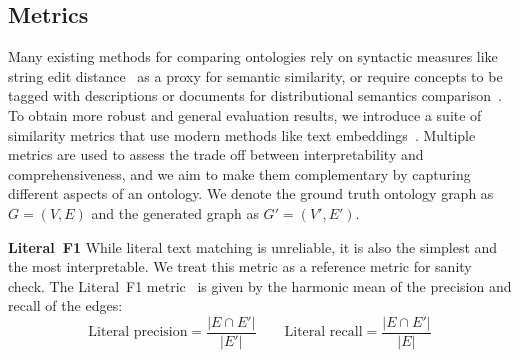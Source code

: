 \documentclass{article}
\newcommand{\fig}[1]{\textcolor{teal}{Figure: #1}}
\begin{document}

\subsection{Metrics}

Many existing methods for comparing ontologies rely on syntactic measures like string edit distance~\cite{Ehrig2005SimilarityFO} as a proxy for semantic similarity, or require concepts to be tagged with descriptions or documents for distributional semantics comparison~\cite{Zavitsanos2011GoldSE}. To obtain more robust and general evaluation results, we introduce a suite of similarity metrics that use modern methods like text embeddings~\cite{reimers-2019-sentence-bert}. Multiple metrics are used to assess the trade off between interpretability and comprehensiveness, and we aim to make them complementary by capturing different aspects of an ontology. We denote the ground truth ontology graph as $G = (V, E)$ and the generated graph as $G' = (V', E')$. 

\textbf{Literal~F1 }
While literal text matching is unreliable, it is also the simplest and the most interpretable. We treat this metric as a reference metric for sanity check. The Literal~F1 metric~\cite{Kashyap2005TaxaMinerAE} is given by the harmonic mean of the precision and recall of the edges:
\[
\text{Literal precision} = \frac{|E \cap E'|}{|E'|} \qquad
\text{Literal recall} = \frac{|E \cap E'|}{|E|}
\]
\end{document}
